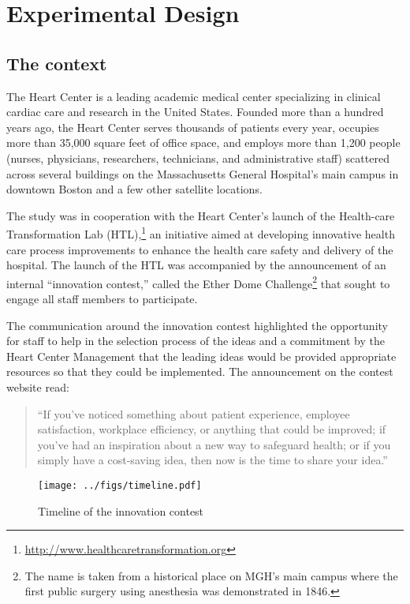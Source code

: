\documentclass[12pt, titlepage]{article}
\begin{document}
\section{Experimental Design}\label{experimental-design}

\subsection{The context}\label{the-context}

The Heart Center is a leading academic medical center specializing in
clinical cardiac care and research in the United States. Founded more
than a hundred years ago, the Heart Center serves thousands of patients
every year, occupies more than 35,000 square feet of office space, and
employs more than 1,200 people (nurses, physicians, researchers,
technicians, and administrative staff) scattered across several
buildings on the Massachusetts General Hospital's main campus in
downtown Boston and a few other satellite locations.

The study was in cooperation with the Heart Center's launch of the
Health-care Transformation Lab (HTL),\footnote{\url{http://www.healthcaretransformation.org}}
an initiative aimed at developing innovative health care process
improvements to enhance the health care safety and delivery of the
hospital. The launch of the HTL was accompanied by the announcement of
an internal ``innovation contest,'' called the Ether Dome
Challenge\footnote{The name is taken from a historical place on MGH's
  main campus where the first public surgery using anesthesia was
  demonstrated in 1846.} that sought to engage all staff members to
participate.

The communication around the innovation contest highlighted the
opportunity for staff to help in the selection process of the ideas and
a commitment by the Heart Center Management that the leading ideas would
be provided appropriate resources so that they could be implemented. The
announcement on the contest website read:

\begin{quote}
``If you've noticed something about patient experience, employee
satisfaction, workplace efficiency, or anything that could be improved;
if you've had an inspiration about a new way to safeguard health; or if
you simply have a cost-saving idea, then now is the time to share your
idea.''
\end{quote}

\begin{figure}
\centering
\caption{Timeline of the innovation contest}
\label{timeline}
\texttt{[image: ../figs/timeline.pdf]}
\end{figure}
\end{document}
